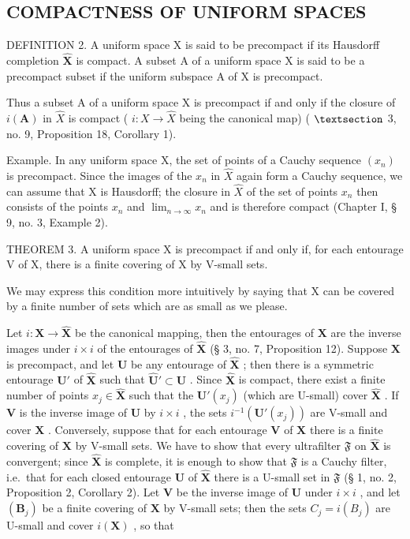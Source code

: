 \subsection{COMPACTNESS OF UNIFORM SPACES}

DEFINITION 2. A uniform space X is said to be precompact if its Hausdorff completion \(\hat{\mathbf{X}}\) is compact. A subset A of a uniform space X is said to be a precompact subset if the uniform subspace A of X is precompact.

Thus a subset A of a uniform space X is precompact if and only if the closure of \(i(\mathbf{A})\) in \(\hat{X}\) is compact ( \(i: X \rightarrow \hat{X}\) being the canonical map) ( \(\S\) 3, no. 9, Proposition 18, Corollary 1).

Example. In any uniform space X, the set of points of a Cauchy sequence \((x_{n})\) is precompact. Since the images of the \(x_{n}\) in \(\hat{X}\) again form a Cauchy sequence, we can assume that X is Hausdorff; the closure in \(\hat{X}\) of the set of points \(x_{n}\) then consists of the points \(x_{n}\) and \(\lim_{n\to\infty}x_{n}\) and is therefore compact (Chapter I, § 9, no. 3, Example 2).

THEOREM 3. A uniform space X is precompact if and only if, for each entourage V of X, there is a finite covering of X by V-small sets.

We may express this condition more intuitively by saying that X can be covered by a finite number of sets which are as small as we please.

Let \(i: \mathbf{X} \to \hat{\mathbf{X}}\) be the canonical mapping, then the entourages of \(\mathbf{X}\) are the inverse images under \(i \times i\) of the entourages of \(\hat{\mathbf{X}}\) (§ 3, no. 7, Proposition 12). Suppose \(\mathbf{X}\) is precompact, and let \(\mathbf{U}\) be any entourage of \(\hat{\mathbf{X}}\) ; then there is a symmetric entourage \(\mathbf{U}'\) of \(\hat{\mathbf{X}}\) such that \(\hat{\mathbf{U}}' \subset \mathbf{U}\) . Since \(\hat{\mathbf{X}}\) is compact, there exist a finite number of points \(x_j \in \hat{\mathbf{X}}\) such that the \(\mathbf{U}'(x_j)\) (which are U-small) cover \(\hat{\mathbf{X}}\) . If \(\mathbf{V}\) is the inverse image of \(\mathbf{U}\) by \(i \times i\) , the sets \(i^{-1}(\mathbf{U}'(x_j))\) are V-small and cover \(\mathbf{X}\) . Conversely, suppose that for each entourage \(\mathbf{V}\) of \(\mathbf{X}\) there is a finite covering of \(\mathbf{X}\) by V-small sets. We have to show that every ultrafilter \(\mathfrak{F}\) on \(\hat{\mathbf{X}}\) is convergent; since \(\hat{\mathbf{X}}\) is complete, it is enough to show that \(\mathfrak{F}\) is a Cauchy filter, i.e.~that for each closed entourage \(\mathbf{U}\) of \(\hat{\mathbf{X}}\) there is a U-small set in \(\mathfrak{F}\) (§ 1, no. 2, Proposition 2, Corollary 2). Let \(\mathbf{V}\) be the inverse image of \(\mathbf{U}\) under \(i \times i\) , and let \((\mathbf{B}_j)\) be a finite covering of \(\mathbf{X}\) by V-small sets; then the sets \(C_j = i(B_j)\) are U-small and cover \(i(\mathbf{X})\) , so that

